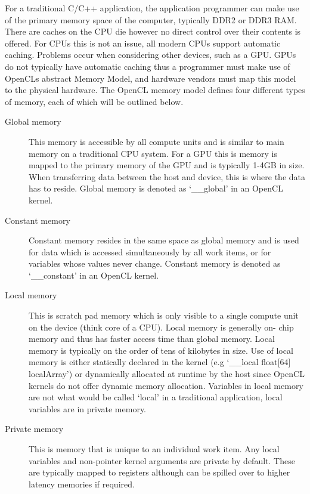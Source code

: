 For a traditional C/C++ application, the application programmer can make use of
the primary memory space of the computer, typically DDR2 or DDR3 RAM. There are
caches on the CPU die however no direct control over their contents is offered.
For CPUs this is not an issue, all modern CPUs support automatic caching.
Problems occur when considering other devices, such as a GPU. GPUs do not
typically have automatic caching thus a programmer must make use of OpenCLs
abstract Memory Model, and hardware vendors must map this model to the physical
hardware. The OpenCL memory model defines four different types of memory, each
of which will be outlined below.

\begin{description}

\item[Global memory] This memory is accessible by all compute units and is
similar to main memory on a traditional CPU system. For a GPU this is memory is
mapped to the primary memory of the GPU and is typically 1-4GB in size. When
transferring data between the host and device, this is where the data has to
reside. Global memory is denoted as `\_\_global' in an OpenCL kernel.

\item[Constant memory] Constant memory resides in the same space as global
memory and is used for data which is accessed simultaneously by all work items,
or for variables whose values never change. Constant memory is denoted as
`\_\_constant' in an OpenCL kernel.

\item[Local memory] This is scratch pad memory which is only visible to a single
compute unit on the device (think core of a CPU). Local memory is generally on-
chip memory and thus has faster access time than global memory. Local memory is
typically on the order of tens of kilobytes in size. Use of local memory is
either statically declared in the kernel (e.g `\_\_local float[64] localArray')
or dynamically allocated at runtime by the host since OpenCL kernels do not
offer dynamic memory allocation. Variables in local memory are not what would be
called `local' in a traditional application, local variables are in private
memory.

\item[Private memory] This is memory that is unique to an individual work item.
Any local variables and non-pointer kernel arguments are private by default.
These are typically mapped to registers although can be spilled over to higher
latency memories if required.

\end{description}

